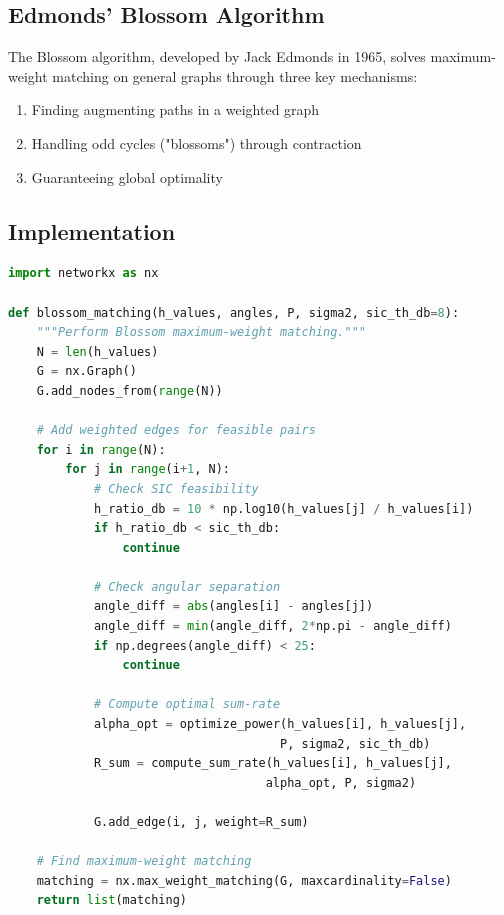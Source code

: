 \subsection{Edmonds' Blossom Algorithm}

The Blossom algorithm, developed by Jack Edmonds in 1965, solves maximum-weight matching on general graphs through three key mechanisms:

\begin{enumerate}
    \item Finding augmenting paths in a weighted graph
    \item Handling odd cycles ("blossoms") through contraction
    \item Guaranteeing global optimality
\end{enumerate}

\subsection{Implementation}

\begin{lstlisting}[language=Python, caption={Blossom Matching Implementation}]
import networkx as nx

def blossom_matching(h_values, angles, P, sigma2, sic_th_db=8):
    """Perform Blossom maximum-weight matching."""
    N = len(h_values)
    G = nx.Graph()
    G.add_nodes_from(range(N))
    
    # Add weighted edges for feasible pairs
    for i in range(N):
        for j in range(i+1, N):
            # Check SIC feasibility
            h_ratio_db = 10 * np.log10(h_values[j] / h_values[i])
            if h_ratio_db < sic_th_db:
                continue
                
            # Check angular separation
            angle_diff = abs(angles[i] - angles[j])
            angle_diff = min(angle_diff, 2*np.pi - angle_diff)
            if np.degrees(angle_diff) < 25:
                continue
            
            # Compute optimal sum-rate
            alpha_opt = optimize_power(h_values[i], h_values[j],
                                      P, sigma2, sic_th_db)
            R_sum = compute_sum_rate(h_values[i], h_values[j],
                                    alpha_opt, P, sigma2)
            
            G.add_edge(i, j, weight=R_sum)
    
    # Find maximum-weight matching
    matching = nx.max_weight_matching(G, maxcardinality=False)
    return list(matching)
\end{lstlisting}

